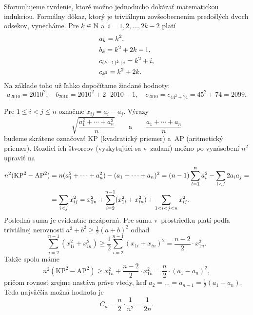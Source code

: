 {Sformulujeme tvrdenie, ktoré možno jednoducho dokázať matematickou indukciou. Formálny dôkaz, ktorý je triviálnym zovšeobecnením predošlých dvoch odsekov, vynecháme. Pre $k\in\Bbb N$ a~$i=1,2,\dots,2k-2$ platí
$$
\aligned
&a_k=k^2,\\
&b_k=k^2+2k-1,\\
&c_{(k-1)^2+i}=k^2+i,\\
&c_{k^2}=k^2+2k.\\
\endaligned
$$
Na základe toho už ľahko dopočítame žiadané hodnoty:
$$
a_{2010}=2010^2,\quad b_{2010}=2010^2+2\cdot2010-1,\quad c_{2010}=c_{44^2+74}=45^2+74=2099.
$$
}

{%
Pre $1 \le i < j \le n$ označme $x_{ij} = a_i - a_j$. Výrazy
$$
\sqrt{\frac{a_1^2+\cdots+a_n^2}n}\qquad\text{a}\qquad
\frac{a_1+\cdots+a_n}n
$$
budeme skrátene označovať KP (kvadratický priemer) a~AP (aritmetický priemer). Rozdiel ich štvorcov (vyskytujúci sa v~zadaní) možno po vynásobení $n^2$ upraviť na
$$
\aligned
n^2({\text{KP}}^2 - {\text{AP}}^2) &= n(a_1^2+\cdots+a_n^2)-(a_1+\cdots+a_n)^2 = (n-1)\sum_{i=1}^na_i^2-\sum_{i<j}2a_ia_j =\\
&=\sum_{i<j}x_{ij}^2=x_{1n}^2+\sum_{i=2}^{n-1}(x_{1i}^2+x_{in}^2)+\sum_{1<i<j<n}x_{ij}^2.
\endaligned
$$
Posledná suma je evidentne nezáporná. Pre sumu v~prostriedku platí podľa triviálnej nerovnosti $a^2+b^2\ge\frac12(a+b)^2$ odhad
$$
\sum_{i=2}^{n-1}(x_{1i}^2+x_{in}^2)\ge\frac12\sum_{i=2}^{n-1}(x_{1i}+x_{in})^2=\frac{n-2}2\cdot x_{1n}^2.
$$
Takže spolu máme
$$
n^2({\text{KP}}^2 - {\text{AP}}^2) \ge x_{1n}^2+\frac{n-2}2\cdot x_{1n}^2=\frac n2\cdot(a_1-a_n)^2,
$$
pričom rovnosť zrejme nastáva práve vtedy, keď $a_2 = \dots = a_{n-1} = \frac12(a_1+a_n)$. Teda najväčšia možná hodnota je
$$
C_n=\frac n2\cdot\frac1{n^2}=\frac1{2n}.
$$
}

